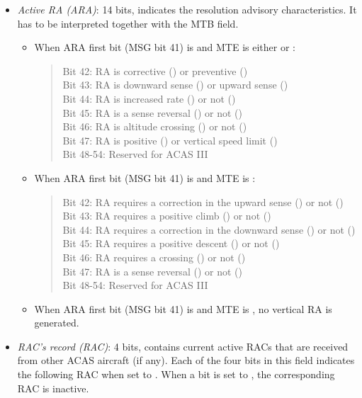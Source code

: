 \begin{itemize}
  \item \emph{Active RA (ARA)}: 14 bits, indicates the resolution advisory characteristics. It has to be interpreted together with the MTB field.

    \begin{itemize}
      \item When ARA first bit (MSG bit 41) is \1 and MTE is either \0 or \1:

      \begin{quote}
        \small
        Bit 42: RA is corrective (\1) or preventive (\0) \\
        Bit 43: RA is downward sense (\1) or upward sense (\0) \\
        Bit 44: RA is increased rate (\1) or not (\0) \\
        Bit 45: RA is a sense reversal (\1) or not (\0) \\
        Bit 46: RA is altitude crossing (\1) or not (\0) \\
        Bit 47: RA is positive (\1) or vertical speed limit (\0) \\
        Bit 48-54: Reserved for ACAS III
      \end{quote}

      \item When ARA first bit (MSG bit 41) is \0 and MTE is \1:

      \begin{quote}
        \small
        Bit 42: RA requires a correction in the upward sense (\1) or not (\0) \\
        Bit 43: RA requires a positive climb (\1) or not (\0) \\
        Bit 44: RA requires a correction in the downward sense (\1) or not (\0) \\
        Bit 45: RA requires a positive descent (\1) or not (\0) \\
        Bit 46: RA requires a crossing (\1) or not (\0) \\
        Bit 47: RA is a sense reversal (\1) or not (\0) \\
        Bit 48-54: Reserved for ACAS III
      \end{quote}

      \item When ARA first bit (MSG bit 41) is \0 and MTE is \0, no vertical RA is generated.
    \end{itemize}


  \item \emph{RAC's record (RAC)}: 4 bits, contains current active RACs that are received from other ACAS aircraft (if any). Each of the four bits in this field indicates the following RAC when set to \1. When a bit is set to \0, the corresponding RAC is inactive.


\end{itemize}
